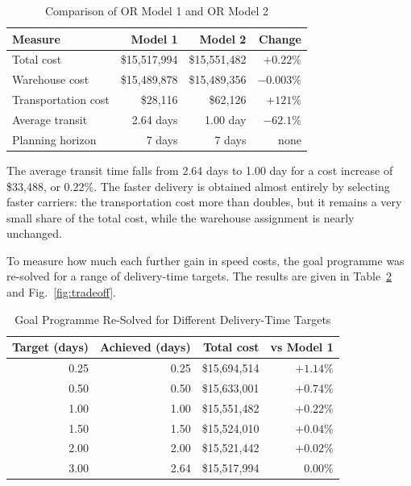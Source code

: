 \documentclass[conference]{IEEEtran}
\begin{document}
\begin{table}[htbp]
\caption{Comparison of OR Model 1 and OR Model 2}
\label{tab:compare}
\centering
\footnotesize
\setlength{\tabcolsep}{4pt}
\renewcommand{\arraystretch}{1.2}
\begin{tabular}{|l|r|r|r|}
\hline
\textbf{Measure} & \textbf{Model 1} & \textbf{Model 2} & \textbf{Change} \\
\hline
Total cost & \$15,517,994 & \$15,551,482 & $+0.22\%$ \\
\hline
Warehouse cost & \$15,489,878 & \$15,489,356 & $-0.003\%$ \\
\hline
Transportation cost & \$28,116 & \$62,126 & $+121\%$ \\
\hline
Average transit & 2.64 days & 1.00 day & $-62.1\%$ \\
\hline
Planning horizon & 7 days & 7 days & none \\
\hline
\end{tabular}
\end{table}

The average transit time falls from 2.64 days to 1.00 day for a cost increase of \$33,488, or 0.22\%. The faster delivery is obtained almost entirely by selecting faster carriers: the transportation cost more than doubles, but it remains a very small share of the total cost, while the warehouse assignment is nearly unchanged.

To measure how much each further gain in speed costs, the goal programme was re-solved for a range of delivery-time targets. The results are given in Table~\ref{tab:tradeoff} and Fig.~\ref{fig:tradeoff}.

\begin{table}[htbp]
\caption{Goal Programme Re-Solved for Different Delivery-Time Targets}
\label{tab:tradeoff}
\centering
\footnotesize
\setlength{\tabcolsep}{4pt}
\renewcommand{\arraystretch}{1.2}
\begin{tabular}{|r|r|r|r|}
\hline
\textbf{Target (days)} & \textbf{Achieved (days)} & \textbf{Total cost} & \textbf{vs Model 1} \\
\hline
0.25 & 0.25 & \$15,694,514 & $+1.14\%$ \\
\hline
0.50 & 0.50 & \$15,633,001 & $+0.74\%$ \\
\hline
1.00 & 1.00 & \$15,551,482 & $+0.22\%$ \\
\hline
1.50 & 1.50 & \$15,524,010 & $+0.04\%$ \\
\hline
2.00 & 2.00 & \$15,521,442 & $+0.02\%$ \\
\hline
3.00 & 2.64 & \$15,517,994 & $0.00\%$ \\
\hline
\end{tabular}
\end{table}
\end{document}
